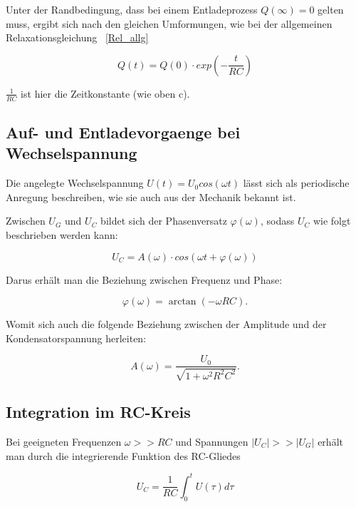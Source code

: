 Unter der Randbedingung, dass bei einem Entladeprozess $Q(\infty) = 0$ gelten muss, ergibt sich nach den gleichen
Umformungen, wie bei der allgemeinen Relaxationsgleichung ~\eqref{Rel_allg}

\begin{equation}
    \label{RelQ}
Q(t) = Q(0)\cdot exp(-\frac{t}{RC})
\end{equation}

$\frac{1}{RC}$ ist hier die Zeitkonstante (wie oben c).


\subsection{Auf- und Entladevorgaenge bei Wechselspannung}
\label{subsec:Entladevorgaenge bei Wechselspannung}

Die angelegte Wechselspannung $U(t) = U_0 cos(\omega t)$ lässt sich als periodische Anregung beschreiben, 
wie sie auch aus der Mechanik bekannt ist.

Zwischen $U_G$ und $U_C$ bildet sich der Phasenversatz $\varphi(\omega)$, sodass $U_C$ wie folgt beschrieben werden
kann:

\begin{equation}
    U_C = A(\omega) \cdot cos(\omega t + \varphi(\omega))
\end{equation}

Darus erhält man die Beziehung zwischen Frequenz und Phase:

\begin{equation}
    \label{PhiArctan}
    \varphi\left(\omega\right)=\arctan\left(-\omega RC\right).
\end{equation}

Womit sich auch die folgende Beziehung zwischen der Amplitude und der Kondensatorspannung herleiten:

\begin{equation}
    \label{eqn:bezAU}
    A\left(\omega\right) = \frac{U_0}{\sqrt{1+\omega^2R^2C^2}}.
\end{equation}

\subsection{Integration im RC-Kreis}
\label{subsec:Integration im RC-Kreis}

Bei geeigneten Frequenzen $\omega >> RC$ und Spannungen $|U_C| >> |U_G|$ erhält man durch die integrierende Funktion des RC-Gliedes 

\begin{equation}
    \label{integrator}
    U_C = \frac{1}{RC} \int_{0}^{t} U(\tau) d\tau
\end{equation}


\cite{sample}
